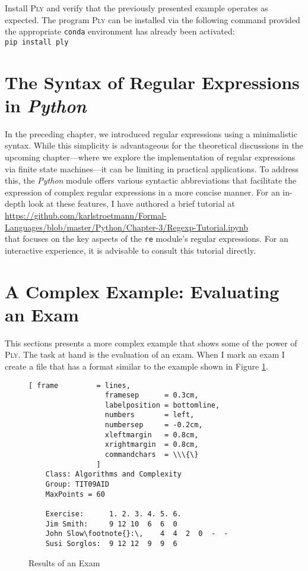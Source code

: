 \homeworkEng
Install \textsc{Ply} and verify that the previously presented example operates as expected.
The program \textsc{Ply} can be installed via the following command provided the appropriate \texttt{conda}
environment has already been activated:
\\[0.2cm]
\hspace*{1.3cm}
\texttt{pip install ply}
\pagebreak

\section{The Syntax of Regular Expressions in \textsl{Python}}
In the preceding chapter, we introduced regular expressions using a minimalistic syntax. While this simplicity
is advantageous for the theoretical discussions in the upcoming chapter---where we explore the implementation of
regular expressions via finite state machines---it can be limiting in practical applications. To address this,
the \textsl{Python} module  offers various syntactic abbreviations that facilitate the
expression of complex regular expressions in a more concise manner. For an in-depth look at these features, I
have authored a brief tutorial at 
\\[0.2cm]
\hspace*{0.3cm}
\href{https://github.com/karlstroetmann/Formal-Languages/blob/master/Python/Chapter-3/Regexp-Tutorial.ipynb}{https://github.com/karlstroetmann/Formal-Languages/blob/master/Python/Chapter-3/Regexp-Tutorial.ipynb}
\\[0.2cm]
that focuses on the key aspects of the \texttt{re} module's regular expressions. For an interactive experience,
it is advisable to consult this tutorial directly. 

\section{A Complex Example: Evaluating an Exam}
This sections presents a more complex example that shows some of the power of \textsc{Ply}.  The
task at hand is the evaluation of an exam.  When I mark an exam I create a file that has a format
similar to the example shown in Figure \ref{fig:result.txt}. 

\begin{figure}[!h]
\centering
\begin{Verbatim}[ frame         = lines, 
                  framesep      = 0.3cm, 
                  labelposition = bottomline,
                  numbers       = left,
                  numbersep     = -0.2cm,
                  xleftmargin   = 0.8cm,
                  xrightmargin  = 0.8cm,
                  commandchars  = \\\{\}
                ]
    Class: Algorithms and Complexity
    Group: TIT09AID
    MaxPoints = 60
   
    Exercise:      1. 2. 3. 4. 5. 6.
    Jim Smith:     9 12 10  6  6  0
    John Slow\footnote{}:\,    4  4  2  0  -  -
    Susi Sorglos:  9 12 12  9  9  6
\end{Verbatim}
\vspace*{-0.3cm}
\caption{Results of an Exam}
\label{fig:result.txt}
\end{figure}

